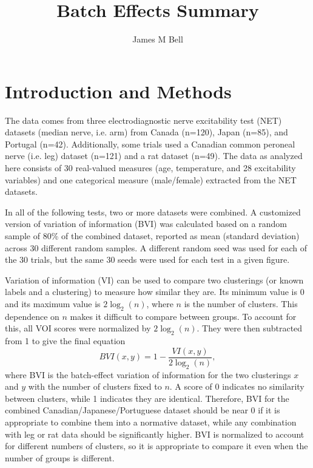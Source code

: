 \documentclass[12pt]{article}
\title{Batch Effects Summary}
\author{James M Bell}
\begin{document}
\maketitle

\section*{Introduction and Methods}

The data comes from three electrodiagnostic nerve excitability test (NET) datasets (median nerve, i.e. arm) from Canada (n=120), Japan (n=85), and Portugal (n=42). Additionally, some trials used a Canadian common peroneal nerve (i.e. leg) dataset (n=121) and a rat dataset (n=49). The data as analyzed here consists of 30 real-valued measures (age, temperature, and 28 excitability variables) and one categorical measure (male/female) extracted from the NET datasets.

In all of the following tests, two or more datasets were combined. A customized version of variation of information (BVI) was calculated based on a random sample of 80\% of the combined dataset, reported as mean (standard deviation) across 30 different random samples. A different random seed was used for each of the 30 trials, but the same 30 seeds were used for each test in a given figure.

Variation of information (VI) can be used to compare two clusterings (or known labels and a clustering) to measure how similar they are. Its minimum value is 0 and its maximum value is $2\log_2(n)$, where $n$ is the number of clusters. This dependence on $n$ makes it difficult to compare between groups. To account for this, all VOI scores were normalized by $2\log_2(n)$. They were then subtracted from 1 to give the final equation
\begin{equation}
BVI(x,y) = 1-\frac{VI(x,y)}{2\log_2(n)},
\end{equation}
where BVI is the batch-effect variation of information for the two clusterings $x$ and $y$ with the number of clusters fixed to $n$. A score of 0 indicates no similarity between clusters, while 1 indicates they are identical. Therefore, BVI for the combined Canadian/Japanese/Portuguese dataset should be near 0 if it is appropriate to combine them into a normative dataset, while any combination with leg or rat data should be significantly higher. BVI is normalized to account for different numbers of clusters, so it is appropriate to compare it even when the number of groups is different.
\end{document}
